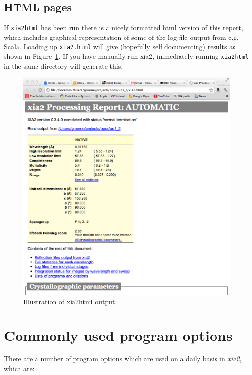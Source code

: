 \documentclass[a4paper, 11pt]{article}
\begin{document}
\subsection{HTML pages}

If \verb|xia2html| has been run there is a nicely formatted html
version of this report, which includes graphical representation of
some of the log file output from e.g. Scala. Loading up
\verb|xia2.html| will give (hopefully self documenting) results as
shown in Figure~\ref{figure-xia2html}. If you have manually run xia2,
immediately running \verb|xia2html| in the same directory will generate this.

\begin{figure}
\caption{Illustration of xia2html output.\label{figure-xia2html}}
\begin{center}
\includegraphics[scale=0.25]{figures/xia2html.png}
\end{center}
\end{figure}

\section{Commonly used program options}

There are a number of program options which are used on a daily basis in 
\emph{xia2}, which are:
\end{document}
